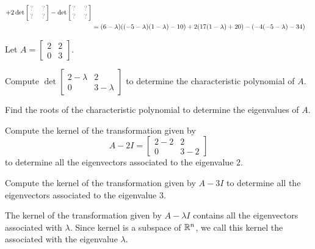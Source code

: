 \begin{applicationActivities}{3}{27}
\begin{activity}{15}
{{\begin{align*}
    +2\det \begin{bmatrix}
      \unknown & \unknown \\
      \unknown & \unknown \\
    \end{bmatrix}
    -\det \begin{bmatrix}
      \unknown & \unknown \\
      \unknown & \unknown \\
    \end{bmatrix}
  \\ &=
    (6-\lambda)((-5-\lambda)(1-\lambda)-10)
    +2(17(1-\lambda)+20)
    -(-4(-5-\lambda)-34)
  \end{align*}}}
\end{activity}

\begin{activity}{15}
Let $A = \begin{bmatrix} 2 & 2 \\ 0 & 3 \end{bmatrix}$.
\begin{subactivity}
Compute $\det \begin{bmatrix} 2-\lambda & 2 \\ 0 & 3-\lambda \end{bmatrix}$ to determine the characteristic polynomial of $A$.
\end{subactivity}
\begin{subactivity}
Find the roots of the characteristic polynomial
to determine the eigenvalues of $A$.
\end{subactivity}
\begin{subactivity}
Compute the kernel of the transformation given by
\[
  A-2I
    =
  \begin{bmatrix} 2-2 & 2 \\ 0 & 3-2 \end{bmatrix}
\] to determine all the eigenvectors associated to the eigenvalue $2$.
\end{subactivity}
\begin{subactivity}
Compute the kernel of the transformation given by $A-3I$ to determine all the eigenvectors associated to the eigenvalue $3$.
\end{subactivity}
\end{activity}

\begin{definition}
  The kernel of the transformation given by \(A-\lambda I\) contains
  all the eigenvectors associated with \(\lambda\). Since kernel is a subspace
  of \(\mathbb{R}^n\), we call this kernel the  associated with the
  eigenvalue \(\lambda\).
\end{definition}



\end{applicationActivities}
